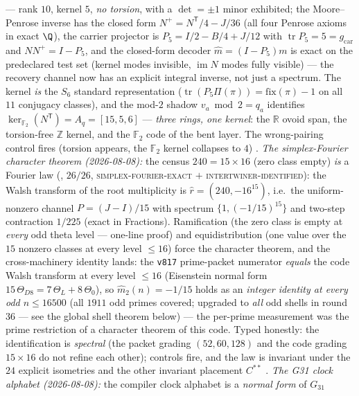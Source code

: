 \documentclass[11pt,a4paper]{article}
\newcommand{\gcar}{g_{\mathrm{car}}}
\newcommand{\Z}{\mathbb{Z}}
\theoremstyle{definition}
\begin{document}
\begin{keybox}
--- rank $10$, kernel $5$, \emph{no torsion}, with a
$\det = \pm1$ minor exhibited; the Moore--Penrose inverse has the
closed form $N^{+} = N^{\mathsf T}/4 - J/36$ (all four Penrose
axioms in exact $\Q$), the carrier projector is $P_5 = I/2 - B/4
+ J/12$ with $\operatorname{tr} P_5 = 5 = \gcar$ and $NN^{+} =
I - P_5$, and the closed-form decoder $\hat m = (I - P_5)m$ is
exact on the predeclared test set (kernel modes invisible,
$\operatorname{im} N$ modes fully visible) --- the recovery
channel now has an explicit integral inverse, not just a
spectrum.  The kernel \emph{is} the $S_6$ standard
representation ($\operatorname{tr}(P_5\Pi(\pi)) =
\mathrm{fix}(\pi) - 1$ on all $11$ conjugacy classes), and the
mod-$2$ shadow $v_a \bmod 2 = q_a$ identifies
$\ker_{\mathbb{F}_2}(N^{\mathsf T}) = A_q = [15,5,6]$ --- \emph{three
rings, one kernel}: the $\mathbb{R}$ ovoid span, the torsion-free $\Z$
kernel, and the $\mathbb{F}_2$ code of the bent layer.  The wrong-pairing
control fires (torsion appears, the $\mathbb{F}_2$ kernel collapses to
$4$) \mE.
\emph{The simplex-Fourier character theorem (2026-08-08):} the
census $240 = 15 \times 16$ (zero class empty) \emph{is} a
Fourier law
(, $26/26$,
\textsc{simplex-fourier-exact} $+$
\textsc{intertwiner-identified}): the Walsh transform of the
root multiplicity is $\hat r = (240, -16^{15})$, i.e.\ the
uniform-nonzero channel $P = (J - I)/15$ with spectrum
$\{1, (-1/15)^{15}\}$ and two-step contraction $1/225$ (exact
in Fractions).  Ramification (the zero class is empty at
\emph{every} odd theta level --- one-line proof) and
equidistribution (one value over the $15$ nonzero classes at
every level $\le 16$) force the character theorem, and the
cross-machinery identity lands: the \texttt{v817} prime-packet
numerator \emph{equals} the code Walsh transform at every level
$\le 16$ (Eisenstein normal form $15\,\Theta_{D8} = 7\,\Theta_L
+ 8\,\Theta_0$), so $\hat m_2(n) = -1/15$ holds as an
\emph{integer identity at every odd $n \le 16500$} (all $1911$
odd primes covered; upgraded to \emph{all} odd shells in round
36 --- see the global shell theorem below) --- the per-prime
measurement was the prime
restriction of a character theorem of this code.  Typed
honestly: the identification is \emph{spectral} (the packet
grading $(52, 60, 128)$ and the code grading $15 \times 16$ do
not refine each other); controls fire, and the law is invariant
under the $24$ explicit isometries and the other invariant
placement $C^{**}$ \mE.
\emph{The G31 clock alphabet (2026-08-08):} the compiler clock
alphabet is a \emph{normal form} of $G_{31}$

\end{keybox}
\end{document}
